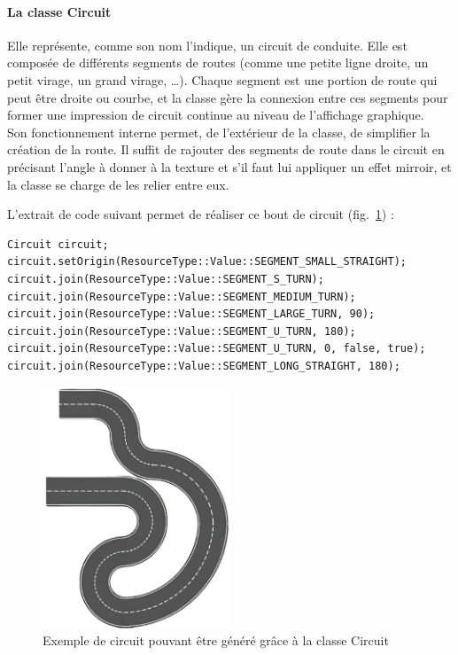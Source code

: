 \paragraph[Circuit]{La classe \textbf{Circuit}}
Elle représente, comme son nom l'indique, un circuit de conduite.
Elle est composée de différents segments de routes (comme une petite ligne droite, un petit virage, un grand virage, \dots).
Chaque segment est une portion de route qui peut être droite ou courbe, et la classe gère la connexion entre ces segments pour former une impression de circuit continue au niveau de l'affichage graphique. \\
Son fonctionnement interne permet, de l'extérieur de la classe, de simplifier la création de la route.
Il suffit de rajouter des segments de route dans le circuit en précisant l'angle à donner à la texture et s'il faut lui appliquer un effet mirroir, et la classe se charge de les relier entre eux.

L'extrait de code suivant permet de réaliser ce bout de circuit (fig.~\ref{fig:example_circuit_1}) :
\begin{lstlisting}[style=CStyle, label={lst:code_circuit}]
Circuit circuit;
circuit.setOrigin(ResourceType::Value::SEGMENT_SMALL_STRAIGHT);
circuit.join(ResourceType::Value::SEGMENT_S_TURN);
circuit.join(ResourceType::Value::SEGMENT_MEDIUM_TURN);
circuit.join(ResourceType::Value::SEGMENT_LARGE_TURN, 90);
circuit.join(ResourceType::Value::SEGMENT_U_TURN, 180);
circuit.join(ResourceType::Value::SEGMENT_U_TURN, 0, false, true);
circuit.join(ResourceType::Value::SEGMENT_LONG_STRAIGHT, 180);
\end{lstlisting}

\begin{figure}[h]
    \centering
    \includegraphics[width=0.5\textwidth]{resources/example_circuit_1}
    \caption{Exemple de circuit pouvant être généré grâce à la classe Circuit}
    \label{fig:example_circuit_1}
\end{figure}

